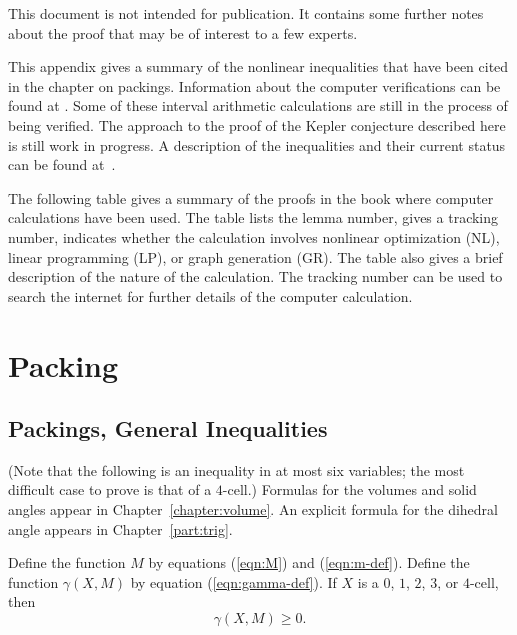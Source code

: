  
\begin{note}%
  This document is not intended for publication.  It contains some
  further notes about the proof that may be of interest to a few
  experts.
\end{note}

\begin{note}%
This appendix gives a summary of the nonlinear inequalities that have
been cited in the chapter on packings.  Information about the computer
verifications can be found at \cite{hales:2009:nonlinear}.  Some
of these interval arithmetic calculations are still in the process
of being verified.  The approach to the proof of the Kepler
conjecture described here is still work in progress.  A description
of the inequalities and their current status can be found
at~\cite{hales:2009:nonlinear}.
\end{note}


\begin{note}
The following table gives a summary of the proofs in the book where
computer calculations have been used.  The table lists the lemma
number, gives a tracking number, indicates whether the calculation
involves nonlinear optimization (NL), linear programming (LP), or
graph generation (GR).  The table also gives a brief description of
the nature of the calculation.  The tracking number can be used to
search the internet for further details of the computer calculation.
\end{note}


\chapter{Packing}


\section{Packings, General Inequalities}


(Note that the following is an inequality in at most six variables; the most
difficult case to prove is that of a $4$-cell.)  Formulas for the
volumes and solid angles appear in Chapter~\ref{chapter:volume}.  An
explicit formula for the dihedral angle appears in
Chapter~\ref{part:trig}.


\begin{calculation}\label{calc:marchal}
% 
Define the function $M$ by equations (\ref{eqn:M}) and
(\ref{eqn:m-def}).  Define the function $\gamma(X,M)$ by equation
(\ref{eqn:gamma-def}).  If $X$ is a $0$, $1$, $2$, $3$, or $4$-cell,
then
\[ 
\gamma(X,M)\ge 0.
\] 
\end{calculation}

